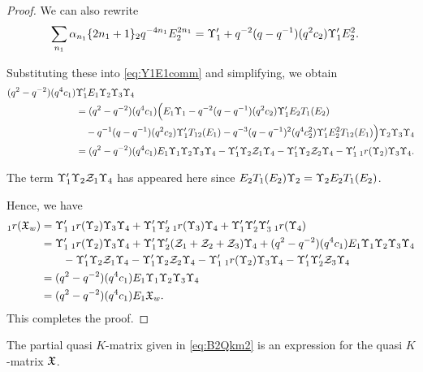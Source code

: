 \documentclass[a4 paper, 10pt]{article}
\begin{document}
\begin{proof}
We can also rewrite
	\begin{align*}
		\sum_{n_1} \alpha_{n_1} \{ 2n_1 + 1 \}_2 q^{-4n_1} E_2^{2n_1} &= \Upsilon^{\prime}_{1} + q^{ -2 }( q - q^{ -1 } ) ( q^{ 2 } c_ 2 ) \Upsilon^{\prime}_{1} E_2^{ 2 }.
	\end{align*}
	
Substituting these into \eqref{eq:Y1E1comm} and simplifying, we obtain
	\begin{align*}
		( q^{ 2 } - q^{ -2 } )( q^{ 4 } c_1 )& \Upsilon^{\prime}_{1} E_1 \Upsilon_{2} \Upsilon_{3} \Upsilon_{4} \\
			&= ( q^{ 2 } - q^{ -2 } )( q^{ 4 } c_1 ) \Big( E_1 \Upsilon_{1} - q^{ -2 }( q - q^{ -1 } ) ( q^{ 2 } c_2 ) \Upsilon^{\prime}_{1} E_2 T_{1}(E_2)\\ 
			&\quad{}- q^{ -1 } ( q - q^{ -1 } ) ( q^{ 2 } c_2 ) \Upsilon^{\prime}_{1} T_{12}(E_1) - q^{ -3 }( q - q^{ -1 } )^{ 2 } ( q^{ 4 } c_2^{ 2 } ) \Upsilon^{\prime}_{1} E_2^{ 2 } T_{12}(E_1) \Big) \Upsilon_{2} \Upsilon_{3} \Upsilon_{4}\\
			&= ( q^{ 2 } - q^{ -2 } ) ( q^{ 4 } c_1 ) E_1 \Upsilon_{1} \Upsilon_{2} \Upsilon_{3} \Upsilon_{4} - \Upsilon^{\prime}_{1} \Upsilon_{2} \mathcal{Z}_{1} \Upsilon_{4} - \Upsilon^{\prime}_{1} \Upsilon_{2} \mathcal{Z}_{2} \Upsilon_{4} - \Upsilon^{\prime}_{1} \: {}_{1}r(\Upsilon_{2}) \Upsilon_{3} \Upsilon_{4}.
	\end{align*}

The term $\Upsilon^{\prime}_{1} \Upsilon_{2} \mathcal{Z}_1 \Upsilon_{4}$ has appeared here since $E_2T_{1}(E_2) \Upsilon_{2} = \Upsilon_{2} E_2T_{1}(E_2)$.

Hence, we have
	\begin{align*}
		{}_{1}r(\mathfrak{X}_{w}) 
			&= \Upsilon^{\prime}_{1} \: {}_{1}r(\Upsilon_{2}) \Upsilon_{3} \Upsilon_{4} + \Upsilon^{\prime}_{1} \Upsilon^{\prime}_{2} \: {}_{1}r(\Upsilon_{3}) \Upsilon_{4} + \Upsilon^{\prime}_{1} \Upsilon^{\prime}_{2} \Upsilon^{\prime}_{3} \: {}_{1}r(\Upsilon_{4}) \\
			&= \Upsilon^{\prime}_{1} \: {}_{1}r(\Upsilon_{2}) \Upsilon_{3} \Upsilon_{4} + \Upsilon^{\prime}_{1} \Upsilon^{\prime}_{2} ( \mathcal{Z}_1 + \mathcal{Z}_2 + \mathcal{Z}_3 ) \Upsilon_{4} + ( q^{ 2 } - q^{ -2 } ) ( q^{ 4 } c_1 ) E_1 \Upsilon_{1} \Upsilon_{2} \Upsilon_{3} \Upsilon_{4}\\ 
			&\qquad{}- \Upsilon^{\prime}_{1} \Upsilon_{2} \mathcal{Z}_{1} \Upsilon_{4} - \Upsilon^{\prime}_{1} \Upsilon_{2} \mathcal{Z}_{2} \Upsilon_{4} - \Upsilon^{\prime}_{1} \: {}_{1}r(\Upsilon_{2}) \Upsilon_{3} \Upsilon_{4} - \Upsilon^{\prime}_{1} \Upsilon^{\prime}_{2} \mathcal{Z}_3 \Upsilon_{4}\\
			&= ( q^{ 2 } - q^{ -2 } ) ( q^{ 4 } c_1 ) E_1 \Upsilon_1 \Upsilon_2 \Upsilon_3 \Upsilon_4 \\
			&= ( q^{ 2 } - q^{ -2 } ) ( q^{ 4 } c_1 ) E_1 \mathfrak{X}_{w}.
	\end{align*}
This completes the proof.

\end{proof}

\begin{proposition}
 The partial quasi $K$-matrix given in \eqref{eq:B2Qkm2} is an expression for the quasi $K$-matrix $\mathfrak{X}$. 
\end{proposition}
\end{document}
